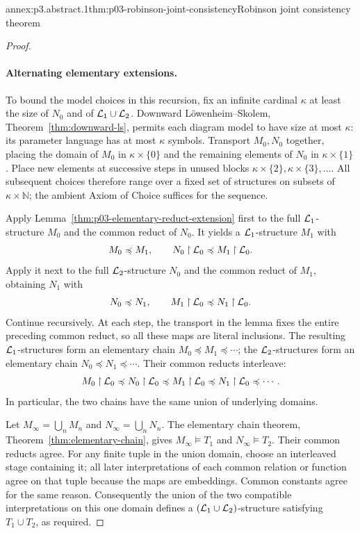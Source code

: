\begin{annexitem}{annex:p3.abstract.1}{thm:p03-robinson-joint-consistency}{Robinson joint consistency theorem}
\begin{proof}
\paragraph{Alternating elementary extensions.}
To bound the model choices in this recursion, fix an infinite cardinal
\(\kappa\) at least the size of \(N_0\) and of
\(\mathcal{L}_1\cup\mathcal{L}_2\).
Downward L\"owenheim--Skolem, Theorem~\ref{thm:downward-ls}, permits
each diagram model to have size at most \(\kappa\): its parameter
language has at most \(\kappa\) symbols.
Transport \(M_0,N_0\) together, placing the domain of \(M_0\) in
\(\kappa\times\{0\}\) and the remaining elements of \(N_0\) in
\(\kappa\times\{1\}\).
Place new elements at successive steps in unused blocks
\(\kappa\times\{2\},\kappa\times\{3\},\ldots\).
All subsequent choices therefore range over a fixed set of structures
on subsets of \(\kappa\times\mathbb N\); the ambient Axiom of Choice
suffices for the sequence.

Apply Lemma~\ref{thm:p03-elementary-reduct-extension} first to the
full \(\mathcal{L}_1\)-structure \(M_0\) and the common reduct of \(N_0\).
It yields a \(\mathcal{L}_1\)-structure \(M_1\) with
\[
 M_0\preccurlyeq M_1,\qquad
 N_0\mathbin{\upharpoonright}\mathcal{L}_0\preccurlyeq M_1\mathbin{\upharpoonright}\mathcal{L}_0.
\]
Apply it next to the full \(\mathcal{L}_2\)-structure \(N_0\) and the
common reduct of \(M_1\), obtaining \(N_1\) with
\[
 N_0\preccurlyeq N_1,\qquad
 M_1\mathbin{\upharpoonright}\mathcal{L}_0\preccurlyeq N_1\mathbin{\upharpoonright}\mathcal{L}_0.
\]
Continue recursively.  At each step, the transport in the lemma fixes
the entire preceding common reduct, so all these maps are literal
inclusions.  The resulting \(\mathcal{L}_1\)-structures form an elementary
chain \(M_0\preccurlyeq M_1\preccurlyeq\cdots\); the
\(\mathcal{L}_2\)-structures form an elementary chain
\(N_0\preccurlyeq N_1\preccurlyeq\cdots\).
Their common reducts interleave:
\[
 M_0\mathbin{\upharpoonright}\mathcal{L}_0\preccurlyeq N_0\mathbin{\upharpoonright}\mathcal{L}_0
 \preccurlyeq M_1\mathbin{\upharpoonright}\mathcal{L}_0\preccurlyeq N_1\mathbin{\upharpoonright}\mathcal{L}_0
 \preccurlyeq\cdots .
\]
In particular, the two chains have the same union of underlying domains.

Let \(M_\infty=\bigcup_n M_n\) and \(N_\infty=\bigcup_n N_n\).
The elementary chain theorem, Theorem~\ref{thm:elementary-chain},
gives \(M_\infty\models T_1\) and \(N_\infty\models T_2\).
Their common reducts agree.  For any finite tuple in the union domain,
choose an interleaved stage containing it; all later interpretations
of each common relation or function agree on that tuple because the
maps are embeddings.  Common constants agree for the same reason.
Consequently the union of the two compatible interpretations on this
one domain defines a \((\mathcal{L}_1\cup\mathcal{L}_2)\)-structure satisfying
\(T_1\cup T_2\), as required.


\end{proof}
\end{annexitem}
